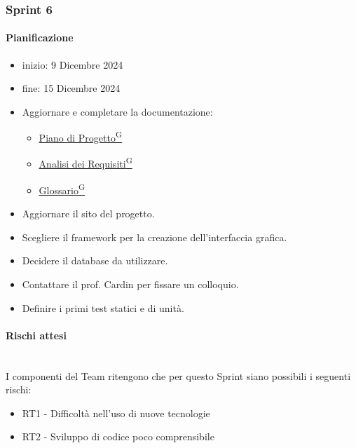 \documentclass{article}
\begin{document}
            \subsubsection{Sprint 6}
                \paragraph{Pianificazione}
                \begin{itemize}
                    \item inizio: 9 Dicembre 2024
                    \item fine: 15 Dicembre 2024
                \end{itemize}
                \begin{itemize}
                    \item Aggiornare e completare la documentazione:
                    \begin{itemize}
                        \item \href{https://code7crusaders.github.io/docs/RTB/documentazione_interna/glossario.html#piano-di-progetto}{Piano di Progetto\textsuperscript{G}}
                        \item \href{https://code7crusaders.github.io/docs/RTB/documentazione_interna/glossario.html#analisi-dei-requisiti}{Analisi dei Requisiti\textsuperscript{G}}
                        \item \href{https://code7crusaders.github.io/docs/RTB/documentazione_interna/glossario.html#glossario}{Glossario\textsuperscript{G}}
                    \end{itemize}
                    \item Aggiornare il sito del progetto.
                    \item Scegliere il framework per la creazione dell'interfaccia grafica.
                    \item Decidere il database da utilizzare.
                    \item Contattare il prof. Cardin per fissare un colloquio.
                    \item Definire i primi test statici e di unità.
                \end{itemize}


                \paragraph{Rischi attesi}\mbox{}\\
                I componenti del Team ritengono che per questo Sprint siano possibili i seguenti rischi:
                \begin{itemize}
                    \item RT1 - Difficoltà nell’uso di nuove tecnologie
                    \item RT2 - Sviluppo di codice poco comprensibile
                \end{itemize}
\end{document}

